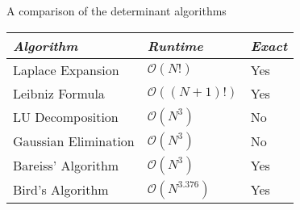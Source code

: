\documentclass{beamer}
\begin{document}
\begin{frame}{A comparison of the determinant algorithms}
    \begin{tabular}{l l l}
        \toprule
        \emph{Algorithm}     & \emph{Runtime}           & \emph{Exact} \\
        \midrule
        Laplace Expansion    & $\mathcal{O}(N!)$        & Yes \\
        Leibniz Formula      & $\mathcal{O}((N+1)!)$    & Yes \\
        LU Decomposition     & $\mathcal{O}(N^3)$       & No \\
        Gaussian Elimination & $\mathcal{O}(N^3)$       & No \\
        Bareiss' Algorithm   & $\mathcal{O}(N^3)$       & Yes \\
        Bird's Algorithm     & $\mathcal{O}(N^{3.376})$ & Yes \\
        \bottomrule
    \end{tabular}

\end{frame}
\end{document}
